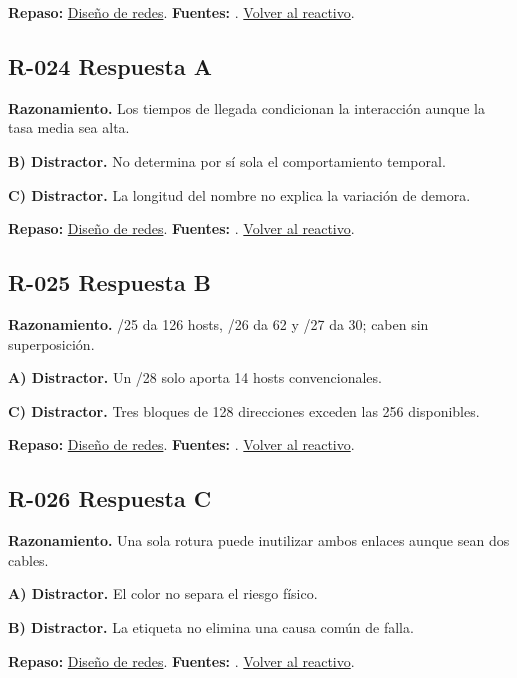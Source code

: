 \textbf{Repaso:} \hyperref[sec:r1]{Diseño de redes}. \textbf{Fuentes:} \cite{rfc8200,rfc4632,networks,vlan}. \hyperref[q:R-023]{Volver al reactivo}.\par\medskip

\subsection*{R-024 \quad Respuesta A}\label{s:R-024}
\textbf{Razonamiento.} Los tiempos de llegada condicionan la interacción aunque la tasa media sea alta.

\textbf{B) Distractor. }No determina por sí sola el comportamiento temporal.

\textbf{C) Distractor. }La longitud del nombre no explica la variación de demora.

\textbf{Repaso:} \hyperref[sec:r1]{Diseño de redes}. \textbf{Fuentes:} \cite{rfc8200,rfc4632,networks,vlan}. \hyperref[q:R-024]{Volver al reactivo}.\par\medskip

\subsection*{R-025 \quad Respuesta B}\label{s:R-025}
\textbf{Razonamiento.} /25 da 126 hosts, /26 da 62 y /27 da 30; caben sin superposición.

\textbf{A) Distractor. }Un /28 solo aporta 14 hosts convencionales.

\textbf{C) Distractor. }Tres bloques de 128 direcciones exceden las 256 disponibles.

\textbf{Repaso:} \hyperref[sec:r1]{Diseño de redes}. \textbf{Fuentes:} \cite{rfc8200,rfc4632,networks,vlan}. \hyperref[q:R-025]{Volver al reactivo}.\par\medskip

\subsection*{R-026 \quad Respuesta C}\label{s:R-026}
\textbf{Razonamiento.} Una sola rotura puede inutilizar ambos enlaces aunque sean dos cables.

\textbf{A) Distractor. }El color no separa el riesgo físico.

\textbf{B) Distractor. }La etiqueta no elimina una causa común de falla.

\textbf{Repaso:} \hyperref[sec:r1]{Diseño de redes}. \textbf{Fuentes:} \cite{rfc8200,rfc4632,networks,vlan}. \hyperref[q:R-026]{Volver al reactivo}.\par\medskip

